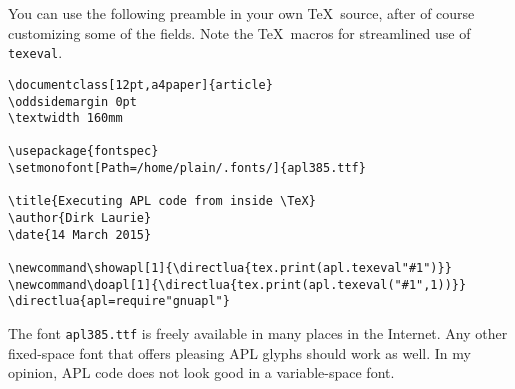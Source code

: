 \documentclass[12pt,a4paper]{article}
\newcommand\showapl[1]{\directlua{tex.print(apl.texeval"#1")}}
\newcommand\doapl[1]{\directlua{tex.print(apl.texeval("#1",1))}}
\begin{document}
You can use the following preamble in your own \TeX\ source, after
of course customizing some of the fields. Note the \TeX\ macros for
streamlined use of \texttt{texeval}.

\begin{verbatim}
\documentclass[12pt,a4paper]{article}
\oddsidemargin 0pt
\textwidth 160mm

\usepackage{fontspec}
\setmonofont[Path=/home/plain/.fonts/]{apl385.ttf}

\title{Executing APL code from inside \TeX}
\author{Dirk Laurie}
\date{14 March 2015}

\newcommand\showapl[1]{\directlua{tex.print(apl.texeval"#1")}}
\newcommand\doapl[1]{\directlua{tex.print(apl.texeval("#1",1))}}
\directlua{apl=require"gnuapl"}
\end{verbatim}

The font \texttt{apl385.ttf} is freely available in many places in the 
Internet. Any other fixed-space font that offers pleasing APL glyphs 
should work as well. In my opinion, APL code does not look good in
a variable-space font.
\end{document}
